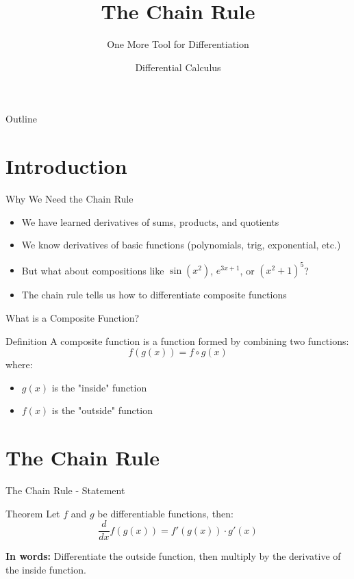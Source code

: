 \documentclass[aspectratio=169]{beamer}
\title{The Chain Rule}
\subtitle{One More Tool for Differentiation}
\author{Differential Calculus}
\date{}
\begin{document}
\begin{frame}
\titlepage
\end{frame}

\begin{frame}{Outline}
\tableofcontents
\end{frame}

\section{Introduction}

\begin{frame}{Why We Need the Chain Rule}
\begin{itemize}
  \item We have learned derivatives of sums, products, and quotients
  \item We know derivatives of basic functions (polynomials, trig, exponential, etc.)
  \item But what about compositions like $\sin(x^2)$, $e^{3x+1}$, or $(x^2+1)^5$?
  \item The chain rule tells us how to differentiate composite functions
\end{itemize}
\end{frame}

\begin{frame}{What is a Composite Function?}
\begin{block}{Definition}
A composite function is a function formed by combining two functions:
\[f(g(x)) = f \circ g(x)\]
where:
\begin{itemize}
  \item $g(x)$ is the "inside" function
  \item $f(x)$ is the "outside" function
\end{itemize}
\end{block}
\end{frame}

\section{The Chain Rule}

\begin{frame}{The Chain Rule - Statement}
\begin{block}{Theorem}
Let $f$ and $g$ be differentiable functions, then:
\[\frac{d}{dx}f(g(x)) = f'(g(x)) \cdot g'(x)\]
\end{block}

\textbf{In words:} Differentiate the outside function, then multiply by the derivative of the inside function.
\end{frame}
\end{document}
